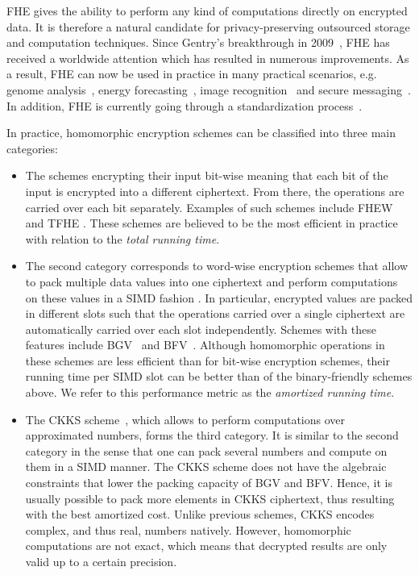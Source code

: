\ac{FHE} gives the ability to perform any kind of computations directly on encrypted data. 
It is therefore a natural candidate for privacy-preserving outsourced storage and computation techniques. 
Since Gentry's breakthrough in 2009~\cite{STOC:Gentry09}, FHE has received a worldwide attention which has resulted in numerous improvements. 
As a result, \ac{FHE} can now be used in practice in many practical scenarios, e.g. genome analysis~\cite{KL15}, energy forecasting~\cite{BCIV17}, image recognition~\cite{BMMP18} and secure messaging~\cite{SP:ACLS18}. 
In addition, FHE is currently going through a standardization process~\cite{HomomorphicEncryptionSecurityStandard}.
  
In practice, homomorphic encryption schemes can be classified into three main categories:
\begin{itemize}
	\item The schemes encrypting their input bit-wise meaning that each bit of the input is encrypted into a different ciphertext. 
	From there, the operations are carried over each bit separately. 
	Examples of such schemes include FHEW \cite{DM15} and TFHE \cite{CGGI16}. 
	These schemes are believed to be the most efficient in practice with relation to the \emph{total running time}.
	\item The second category corresponds to word-wise encryption schemes that allow to pack multiple data values into one ciphertext and perform computations on these values in a \ac{SIMD} fashion \cite{SV14}. 
	In particular, encrypted values are packed in different slots such that the operations carried over a single ciphertext are automatically carried over each slot independently. 
	Schemes with these features include BGV~\cite{BGV12} and BFV~\cite{C:Brakerski12,FV12}. 
	Although homomorphic operations in these schemes are less efficient than for bit-wise encryption schemes, their running time per SIMD slot can be better than of the binary-friendly schemes above. 
	We refer to this performance metric as the \emph{amortized running time}.
	\item The CKKS scheme~\cite{CKKS17}, which allows to perform computations over approximated numbers, forms the third category. 
	It is similar to the second category in the sense that one can pack several numbers and compute on them in a SIMD manner.
	The CKKS scheme does not have the algebraic constraints that lower the packing capacity of BGV and BFV. 
	Hence, it is usually possible to pack more elements in CKKS ciphertext, thus resulting with the best amortized cost. 
	Unlike previous schemes, CKKS encodes complex, and thus real, numbers natively. 
	However, homomorphic computations are not exact, which means that decrypted results are only valid up to a certain precision. 
\end{itemize}

